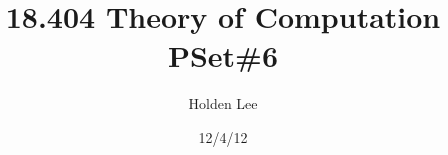 
\makeatother



%
%
\makeatletter
\newenvironment{problem}{\@startsection
       {section}
       {1}
       {-.2em}
       {-3.5ex plus -1ex minus -.2ex}
       {2.3ex plus .2ex}
       {\pagebreak[3]%
       \large\bf\noindent{Problem }
       }
       }
       {%
       }
\makeatother

\renewcommand{\div}{\operatorname{div}}
%
%
\usepackage{fancyhdr}
\pagestyle{fancy}
\rhead{\thepage} 
\cfoot{} 
\renewcommand{\headrulewidth}{.3pt} 
\renewcommand{\footrulewidth}{.3pt}
\setlength\voffset{-0.25in}
\setlength\textheight{648pt}



%
%    

\title{18.404 Theory of Computation PSet\#6}%
\author{Holden Lee}
\date{12/4/12}%
\maketitle

